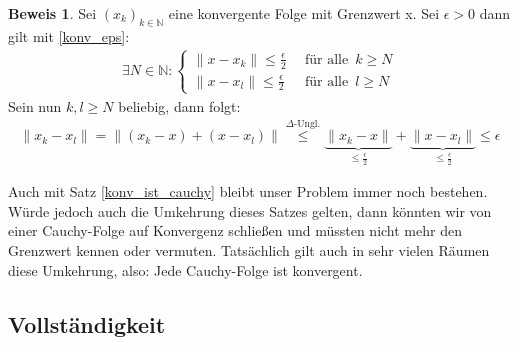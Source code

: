\documentclass[10pt,a4paper]{article}
\theoremstyle{plain}
\theoremstyle{definition}
\theoremstyle{nonumberplain}
\newtheorem{beweis}{Beweis}
\newenvironment{bew}{\begin{beweis}}{\end{beweis}}
\newcommand{\N}{\mathbb{N}}
\begin{document}
\begin{bew}
Sei ${(x_k)}_{k \in \N}$ eine konvergente Folge mit Grenzwert x. Sei $\epsilon > 0$ dann gilt mit \hyperref[konv_eps]{\ref*{konv_eps}}:
\begin{align*}
\exists N \in \N : 
\begin{cases}
\|x - x_k\| \leq \frac{\epsilon}{2} & \enspace \text{für alle} \enspace k \geq N\\
\|x - x_l\| \leq \frac{\epsilon}{2} &\enspace \text{für alle} \enspace l \geq N
\end{cases}
\end{align*}
Sein nun $k, l \geq N$ beliebig, dann folgt:
\begin{align*}
\|x_k - x_l\| = \|(x_k - x) + (x - x_l)\| \overset{\Delta\text{-Ungl.}}\leq \underbrace{\|x_k - x\|}_{\leq \frac{\epsilon}{2}} + \underbrace{\|x - x_l\|}_{\leq \frac{\epsilon}{2}} \leq \epsilon 
\end{align*}
\end{bew}
Auch mit Satz \hyperref[konv_ist_cauchy]{\ref*{konv_ist_cauchy}} bleibt unser Problem immer noch bestehen. Würde jedoch auch die Umkehrung dieses Satzes gelten, dann könnten wir von einer Cauchy-Folge auf Konvergenz schließen und müssten nicht mehr den Grenzwert kennen oder vermuten. Tatsächlich gilt auch in sehr vielen Räumen diese Umkehrung, also: Jede Cauchy-Folge ist konvergent.
\newpage

\subsection{Vollständigkeit}
\end{document}
